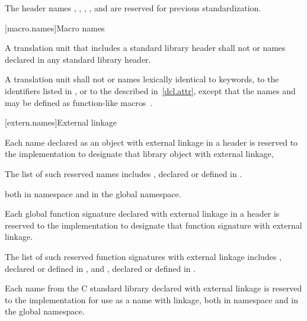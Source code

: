 \pnum
The header names
,
,
,
, and
are reserved for previous standardization.

[macro.names]{Macro names}

\pnum
{}%
%
A translation unit that includes a standard library header shall not
 or  names declared in any standard
library header.

\pnum
{}%
A translation unit shall not  or 
names lexically identical
to keywords,
to the identifiers listed in , or
to the  described in~\ref{dcl.attr},
except that the names  and  may be
defined as function-like macros~.

[extern.names]{External linkage}

\pnum
Each name declared as an object with external linkage
%
in a header is reserved to the implementation to designate that library
object with external linkage,%
%
\begin{footnote}
The list of such reserved names includes
, declared or defined in .
\end{footnote}
both in namespace  and in the global namespace.

\pnum
Each
%
global function signature declared with
%
external linkage in a header is reserved to the
implementation to designate that function signature with
%
external linkage.%
\begin{footnote}
The list of such reserved function
signatures with external linkage includes
%
,
declared or defined in ,
and
%
%
,
declared or defined in
.
\end{footnote}

\pnum
Each name from the C standard library declared with external linkage
%
is reserved to the implementation for use as a name with
%
%
linkage,
both in namespace  and in the global namespace.

